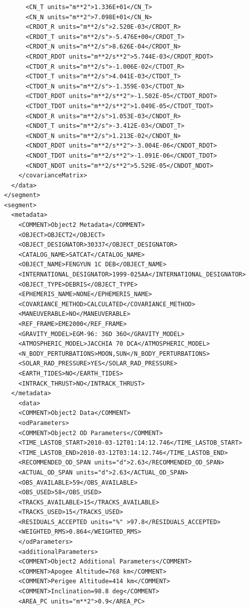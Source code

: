 \begin{lstlisting}
      <CN_T units="m**2">1.336E+01</CN_T>
      <CN_N units="m**2">7.098E+01</CN_N>
      <CRDOT_R units="m**2/s">2.520E-03</CRDOT_R>
      <CRDOT_T units="m**2/s">-5.476E+00</CRDOT_T>
      <CRDOT_N units="m**2/s">8.626E-04</CRDOT_N>
      <CRDOT_RDOT units="m**2/s**2">5.744E-03</CRDOT_RDOT>
      <CTDOT_R units="m**2/s">-1.006E-02</CTDOT_R>
      <CTDOT_T units="m**2/s">4.041E-03</CTDOT_T>
      <CTDOT_N units="m**2/s">-1.359E-03</CTDOT_N>
      <CTDOT_RDOT units="m**2/s**2">-1.502E-05</CTDOT_RDOT>
      <CTDOT_TDOT units="m**2/s**2">1.049E-05</CTDOT_TDOT>
      <CNDOT_R units="m**2/s">1.053E-03</CNDOT_R>
      <CNDOT_T units="m**2/s">-3.412E-03</CNDOT_T>
      <CNDOT_N units="m**2/s">1.213E-02</CNDOT_N>
      <CNDOT_RDOT units="m**2/s**2">-3.004E-06</CNDOT_RDOT>
      <CNDOT_TDOT units="m**2/s**2">-1.091E-06</CNDOT_TDOT>
      <CNDOT_NDOT units="m**2/s**2">5.529E-05</CNDOT_NDOT>
    </covarianceMatrix>
  </data>
</segment>
<segment>
  <metadata>
    <COMMENT>Object2 Metadata</COMMENT>
    <OBJECT>OBJECT2</OBJECT>
    <OBJECT_DESIGNATOR>30337</OBJECT_DESIGNATOR>
    <CATALOG_NAME>SATCAT</CATALOG_NAME>
    <OBJECT_NAME>FENGYUN 1C DEB</OBJECT_NAME>
    <INTERNATIONAL_DESIGNATOR>1999-025AA</INTERNATIONAL_DESIGNATOR>
    <OBJECT_TYPE>DEBRIS</OBJECT_TYPE>
    <EPHEMERIS_NAME>NONE</EPHEMERIS_NAME>
    <COVARIANCE_METHOD>CALCULATED</COVARIANCE_METHOD>
    <MANEUVERABLE>NO</MANEUVERABLE>
    <REF_FRAME>EME2000</REF_FRAME>
    <GRAVITY_MODEL>EGM-96: 36D 36O</GRAVITY_MODEL>
    <ATMOSPHERIC_MODEL>JACCHIA 70 DCA</ATMOSPHERIC_MODEL>
    <N_BODY_PERTURBATIONS>MOON,SUN</N_BODY_PERTURBATIONS>
    <SOLAR_RAD_PRESSURE>YES</SOLAR_RAD_PRESSURE>
    <EARTH_TIDES>NO</EARTH_TIDES>
    <INTRACK_THRUST>NO</INTRACK_THRUST>
  </metadata>
    <data>
    <COMMENT>Object2 Data</COMMENT>
    <odParameters>
    <COMMENT>Object2 OD Parameters</COMMENT>
    <TIME_LASTOB_START>2010-03-12T01:14:12.746</TIME_LASTOB_START>
    <TIME_LASTOB_END>2010-03-12T03:14:12.746</TIME_LASTOB_END>
    <RECOMMENDED_OD_SPAN units="d">2.63</RECOMMENDED_OD_SPAN>
    <ACTUAL_OD_SPAN units="d">2.63</ACTUAL_OD_SPAN>
    <OBS_AVAILABLE>59</OBS_AVAILABLE>
    <OBS_USED>58</OBS_USED>
    <TRACKS_AVAILABLE>15</TRACKS_AVAILABLE>
    <TRACKS_USED>15</TRACKS_USED>
    <RESIDUALS_ACCEPTED units="%" >97.8</RESIDUALS_ACCEPTED>
    <WEIGHTED_RMS>0.864</WEIGHTED_RMS>
    </odParameters>
    <additionalParameters>
    <COMMENT>Object2 Additional Parameters</COMMENT>
    <COMMENT>Apogee Altitude=768 km</COMMENT>
    <COMMENT>Perigee Altitude=414 km</COMMENT>
    <COMMENT>Inclination=98.8 deg</COMMENT>
    <AREA_PC units="m**2">0.9</AREA_PC>

\end{lstlisting}
